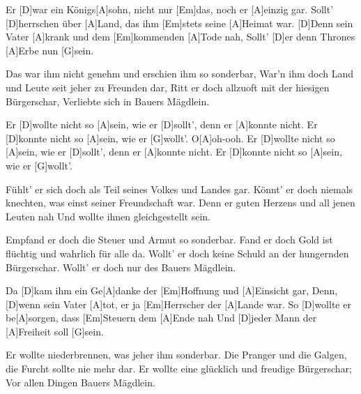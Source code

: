 

\begin{guitar}
	Er [D]war ein Königs[A]sohn, nicht nur [Em]das, noch er [A]einzig gar.
	Sollt' [D]herrschen über [A]Land, das ihm [Em]stets seine [A]Heimat war.
	[D]Denn sein Vater [A]krank und dem [Em]kommenden [A]Tode nah,
	Sollt' [D]er denn Thrones [A]Erbe nun [G]sein.
	
	Das war ihm nicht genehm und erschien ihm so sonderbar,
	War'n ihm doch Land und Leute seit jeher zu Freunden dar,
	Ritt er doch allzuoft mit der hiesigen Bürgerschar,
	Verliebte sich in Bauers Mägdlein.
	
	\begin{highlightbar}
		Er [D]wollte nicht so [A]sein, wie er [D]sollt', denn er [A]konnte nicht.
		Er [D]konnte nicht so [A]sein, wie er [G]wollt'. O[A]oh-ooh.
		Er [D]wollte nicht so [A]sein, wie er [D]sollt', denn er [A]konnte nicht.
		Er [D]konnte nicht so [A]sein, wie er [G]wollt'.
	\end{highlightbar}
	
	\songsection{Strophe 2}
	Fühlt' er sich doch als Teil seines Volkes und Landes gar.
	Könnt' er doch niemals knechten, was einst seiner Freundschaft war.
	Denn er guten Herzens und all jenen Leuten nah
	Und wollte ihnen gleichgestellt sein.
	
	Empfand er doch die Steuer und Armut so sonderbar.
	Fand er doch Gold ist flüchtig und wahrlich für alle da.
	Wollt' er doch keine Schuld an der hungernden Bürgerschar.
	Wollt' er doch nur des Bauers Mägdlein.
	
	\begin{highlightbar}
		  \optionalChord{(x2)}
	\end{highlightbar}
	\pagebreak
	Da [D]kam ihm ein Ge[A]danke der [Em]Hoffnung und [A]Einsicht gar,
	Denn, [D]wenn sein Vater [A]tot, er ja [Em]Herrscher der [A]Lande war.
	So [D]wollte er be[A]sorgen, dass [Em]Steuern dem [A]Ende nah
	Und [D]jeder Mann der [A]Freiheit soll [G]sein.
	
	Er wollte niederbrennen, was jeher ihm sonderbar.
	Die Pranger und die Galgen, die Furcht sollte nie mehr dar.
	Er wollte eine glücklich und freudige Bürgerschar;
	Vor allen Dingen Bauers Mägdlein.
	

\end{guitar}
